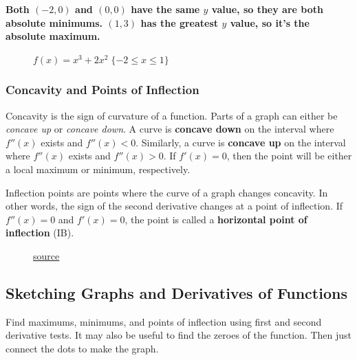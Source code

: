 \documentclass[12pt]{article}
\begin{document}
\noindent \textbf{Both $(-2, 0)$ and $(0, 0)$ have the same $y$ value, so they are both absolute minimums. $(1, 3)$ has the greatest $y$ value, so it's the absolute maximum.}
\begin{figure}[H]
    \begin{center}
        \caption{$f(x) = x^3 + 2x^2 \; \{-2 \le x \le 1 \}$}
        \label{fig:absextremaclosed}
    \end{center}
\end{figure}

\subsubsection{Concavity and Points of Inflection}
Concavity is the sign of curvature of a function. Parts of a graph can either be \textit{concave up} or \textit{concave down}. A curve is \textbf{concave down} on the interval where $f''(x)$ exists and $f''(x) < 0$. Similarly, a curve is \textbf{concave up} on the interval where $f''(x)$ exists and $f''(x) > 0$. If $f'(x) = 0$, then the point will be either a local maximum or minimum, respectively.

Inflection points are points where the curve of a graph changes concavity. In other words, the sign of the second derivative changes at a point of inflection. If $f''(x) = 0$ and $f'(x) =  0$, the point is called a \textbf{horizontal point of inflection} (IB).

\begin{figure}[H]
    \begin{center}
        \caption{\href{https://www.khanacademy.org/math/ap-calculus-ab/ab-diff-analytical-applications-new/ab-5-6b/a/review-analyzing-the-second-derivative-to-find-inflection-points}{source}}
        \label{fig:concavityinflection}
    \end{center}
\end{figure}

\subsection{Sketching Graphs and Derivatives of Functions} %
Find maximums, minimums, and points of inflection using first and second derivative tests. It may also be useful to find the zeroes of the function. Then just connect the dots to make the graph.
\end{document}
